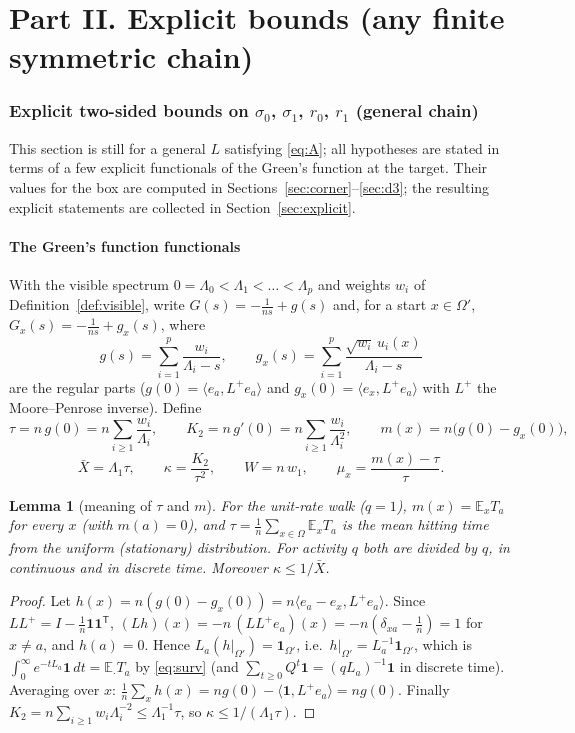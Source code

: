 \documentclass[11pt,a4paper]{article}
\newcommand{\one}{\mathbf 1}
\newcommand{\E}{\mathbb E}
\newcommand{\ip}[2]{\langle #1,#2\rangle}
\newcommand{\Xb}{\bar X}
\theoremstyle{plain}
\newtheorem{lemma}[theorem]{Lemma}
\theoremstyle{definition}
\numberwithin{equation}{section}
\begin{document}
\part*{Part II. Explicit bounds (any finite symmetric chain)}
\section{Explicit two-sided bounds on $\sigma_0$, $\sigma_1$, $r_0$, $r_1$ (general chain)}\label{sec:bounds}

This section is still for a general $L$ satisfying \eqref{eq:A}; all hypotheses are stated in terms of a few explicit functionals of the Green's function at the target. Their values for the box are computed in Sections~\ref{sec:corner}--\ref{sec:d3}; the resulting explicit statements are collected in Section~\ref{sec:explicit}.

\subsection{The Green's function functionals}
With the visible spectrum $0=\Lambda_0<\Lambda_1<\dots<\Lambda_p$ and weights $w_i$ of Definition~\ref{def:visible}, write $G(s)=-\frac1{ns}+g(s)$ and, for a start $x\in\Omega'$, $G_x(s)=-\frac1{ns}+g_x(s)$, where
\begin{equation}\label{eq:g}
g(s)=\sum_{i=1}^p\frac{w_i}{\Lambda_i-s},\qquad g_x(s)=\sum_{i=1}^p\frac{\sqrt{w_i}\,u_i(x)}{\Lambda_i-s}
\end{equation}
are the regular parts ($g(0)=\ip{e_a}{L^+e_a}$ and $g_x(0)=\ip{e_x}{L^+e_a}$ with $L^+$ the Moore--Penrose inverse). Define
\begin{equation}\label{eq:functionals}
\tau=n\,g(0)=n\sum_{i\ge1}\frac{w_i}{\Lambda_i},\qquad K_2=n\,g'(0)=n\sum_{i\ge1}\frac{w_i}{\Lambda_i^2},\qquad m(x)=n\big(g(0)-g_x(0)\big),
\end{equation}
\begin{equation}\label{eq:dimless}
\Xb=\Lambda_1\tau,\qquad \kappa=\frac{K_2}{\tau^2},\qquad W=n\,w_1,\qquad \mu_x=\frac{m(x)-\tau}{\tau}.
\end{equation}

\begin{lemma}[meaning of $\tau$ and $m$]\label{lem:taum}
For the unit-rate walk ($q=1$), $m(x)=\E_xT_a$ for every $x$ (with $m(a)=0$), and $\tau=\frac1n\sum_{x\in\Omega}\E_xT_a$ is the mean hitting time from the uniform (stationary) distribution. For activity $q$ both are divided by $q$, in continuous and in discrete time. Moreover $\kappa\le1/\Xb$.
\end{lemma}
\begin{proof}
Let $h(x)=n(g(0)-g_x(0))=n\ip{e_a-e_x}{L^+e_a}$. Since $LL^+=I-\frac1n\one\one^{\mathsf T}$, $(Lh)(x)=-n\,(LL^+e_a)(x)=-n(\delta_{xa}-\frac1n)=1$ for $x\ne a$, and $h(a)=0$. Hence $L_a(h|_{\Omega'})=\one_{\Omega'}$, i.e.\ $h|_{\Omega'}=L_a^{-1}\one_{\Omega'}$, which is $\int_0^\infty e^{-tL_a}\one\,dt=\E_\cdot T_a$ by \eqref{eq:surv} (and $\sum_{t\ge0}Q^t\one=(qL_a)^{-1}\one$ in discrete time). Averaging over $x$: $\frac1n\sum_xh(x)=n g(0)-\ip{\one}{L^+e_a}=ng(0)$. Finally $K_2=n\sum_{i\ge1}w_i\Lambda_i^{-2}\le\Lambda_1^{-1}\tau$, so $\kappa\le1/(\Lambda_1\tau)$.
\end{proof}
\end{document}
